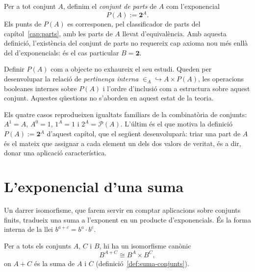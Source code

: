 \begin{definicio}\label{def:conjunt-parts}
Per a tot conjunt \(A\), definim el \emph{conjunt de parts} de \(A\) com
l'exponencial
\[
P(A):=\mathbf2^{A}.
\]
Els punts de \(P(A)\) es corresponen, pel classificador de parts del
capítol~\ref{cap:parts}, amb les parts de \(A\) llevat d'equivalència.
Amb aquesta definició, l'existència del conjunt de parts no requereix cap
axioma nou més enllà del d'exponencials: és el cas particular \(B=\mathbf2\).
\end{definicio}

\begin{observacio}\label{obs:parts-obert}
Definir \(P(A)\) com a objecte no exhaureix el seu estudi. Queden per
desenvolupar la relació de \emph{pertinença interna}
\(\in_A\hookrightarrow A\times P(A)\), les operacions booleanes internes
sobre \(P(A)\) i l'ordre d'inclusió com a estructura sobre aquest conjunt.
Aquestes qüestions no s'aborden en aquest estat de la teoria.
\end{observacio}

\begin{observacio}\label{obs:exponencials-basics-classica}
Els quatre casos reprodueixen igualtats familiars de la combinatòria de
conjunts: \(A^1=A\), \(A^0=1\), \(1^A=1\) i \(2^A=\mathcal P(A)\). L'últim
és el que motiva la definició \(P(A):=\mathbf2^{A}\) d'aquest capítol, que
el següent desenvoluparà:
triar una part de \(A\) és el mateix que assignar a cada element un dels
dos valors de veritat, és a dir, donar una aplicació característica.
\end{observacio}

\section{L'exponencial d'una suma}\label{sec:exponencial-suma}

Un darrer isomorfisme, que farem servir en comptar aplicacions sobre
conjunts finits, tradueix una suma a l'exponent en un producte
d'exponencials. És la forma interna de la llei \(b^{a+c}=b^{a}\cdot
b^{c}\).

\begin{proposicio}\label{prop:exponencial-suma}
Per a tots els conjunts \(A\), \(C\) i \(B\), hi ha un isomorfisme canònic
\[
B^{A+C}\cong B^{A}\times B^{C},
\]
on \(A+C\) és la suma de \(A\) i \(C\) (definició~\ref{def:suma-conjunts}).
\end{proposicio}

